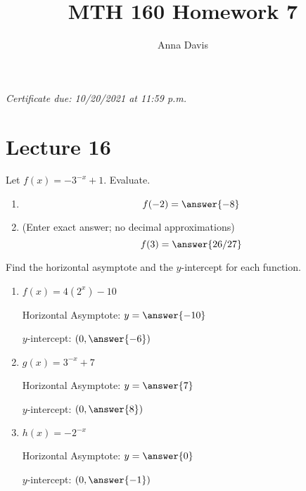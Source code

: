 \documentclass{ximera}
\author{Anna Davis} \title{MTH 160 Homework 7}
\begin{document}
\begin{abstract}

\end{abstract}
\maketitle
 \textit{Certificate due: 10/20/2021 at 11:59 p.m.}

 \section{Lecture 16}
 
  \begin{problem}\label{prob:160hom7prob1} 
Let $f(x)=-3^{-x}+1$.  Evaluate.
  \begin{enumerate}
\item
 $$f(-2)=\answer{-8}$$
\item (Enter exact answer; no decimal approximations)
$$f(3)=\answer{26/27}$$
  \end{enumerate}
\end{problem}  
   \begin{problem}\label{prob:160hom7prob2}
 Find the horizontal asymptote and the $y$-intercept for each function.
 \begin{enumerate}
     \item $f(x)=4(2^x)-10$
     
     Horizontal Asymptote: $y=\answer{-10}$
     
     $y$-intercept: $(0, \answer{-6})$
     \item $g(x)=3^{-x}+7$
     
     Horizontal Asymptote: $y=\answer{7}$
     
     $y$-intercept: $(0, \answer{8})$
     \item $h(x)=-2^{-x}$
     
     Horizontal Asymptote: $y=\answer{0}$
     
     $y$-intercept: $(0, \answer{-1})$
 \end{enumerate}
   \end{problem}
\end{document}

